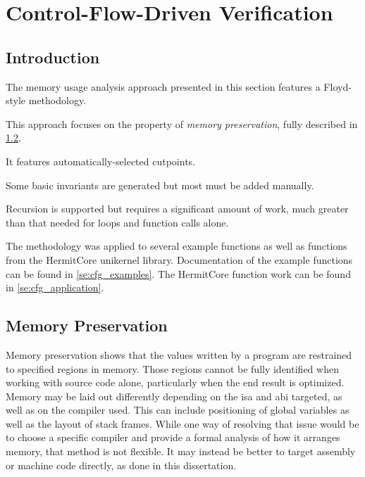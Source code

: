 \chapter{Control-Flow-Driven Verification}\label{ch:cfg}

\section{Introduction}\label{se:cfg_intro}
The memory usage analysis approach presented in this section features a Floyd-style methodology.

This approach focuses on the property of \emph{memory preservation},
fully described in \cref{se:memory_preservation}.

It features automatically-selected cutpoints.

Some basic invariants are generated but most must be added manually.

Recursion is supported but requires a significant amount of work,
much greater than that needed for loops and function calls alone.

The methodology was applied to several example functions
as well as functions from the HermitCore unikernel library.
Documentation of the example functions can be found in \cref{se:cfg_examples}.
The HermitCore function work can be found in \cref{se:cfg_application}.

\section{Memory Preservation}\label{se:memory_preservation}
Memory preservation shows that the values written by a program
are restrained to specified regions in memory.
Those regions cannot be fully identified when working with source code alone,
particularly when the end result is optimized.
Memory may be laid out differently depending on the \ac{isa} and \ac{abi} targeted,
as well as on the compiler used.
This can include positioning of global variables as well as the layout of stack frames.
While one way of resolving that issue would be to choose a specific compiler
and provide a formal analysis of how it arranges memory, that method is not flexible.
It may instead be better to target assembly or machine code directly,
as done in this dissertation.

